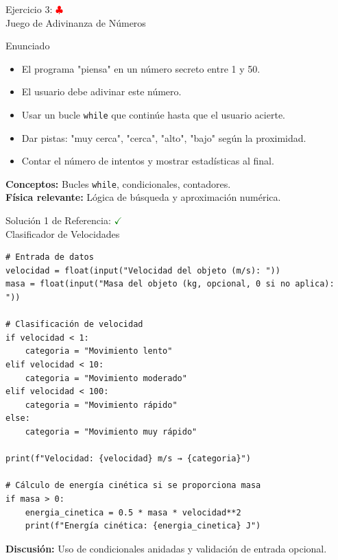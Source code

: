 \documentclass[10pt]{beamer}
\newif\ifshowsolutions
\begin{document}
\begin{frame}{Ejercicio 3: \hfill \textcolor{red}{$\clubsuit$} \\ Juego de Adivinanza de Números}
  \begin{block}{Enunciado}
    \begin{itemize}
      \item El programa "piensa" en un número secreto entre 1 y 50.
      \item El usuario debe adivinar este número.
      \item Usar un bucle \texttt{while} que continúe hasta que el usuario acierte.
      \item Dar pistas: "muy cerca", "cerca", "alto", "bajo" según la proximidad.
      \item Contar el número de intentos y mostrar estadísticas al final.
    \end{itemize}
  \end{block}
  
  \textbf{Conceptos:} Bucles \texttt{while}, condicionales, contadores.
  \\
  \textbf{Física relevante:} Lógica de búsqueda y aproximación numérica.
\end{frame}

\ifshowsolutions
\begin{frame}[fragile]{Solución 1 de Referencia: \hfill \textcolor{green}{$\checkmark$} \\ Clasificador de Velocidades}
\begin{verbatim}
# Entrada de datos
velocidad = float(input("Velocidad del objeto (m/s): "))
masa = float(input("Masa del objeto (kg, opcional, 0 si no aplica): "))

# Clasificación de velocidad
if velocidad < 1:
    categoria = "Movimiento lento"
elif velocidad < 10:
    categoria = "Movimiento moderado"
elif velocidad < 100:
    categoria = "Movimiento rápido"
else:
    categoria = "Movimiento muy rápido"

print(f"Velocidad: {velocidad} m/s → {categoria}")

# Cálculo de energía cinética si se proporciona masa
if masa > 0:
    energia_cinetica = 0.5 * masa * velocidad**2
    print(f"Energía cinética: {energia_cinetica} J")
\end{verbatim}
\textbf{Discusión:} Uso de condicionales anidadas y validación de entrada opcional.
\end{frame}
\end{document}
